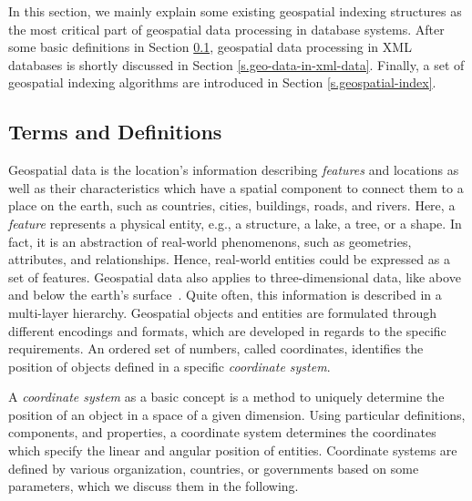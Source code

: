 \documentclass[a4paper,12pt]{article}
\begin{document}
In this section, we mainly explain some existing geospatial indexing structures as the most critical part of geospatial data processing in database systems. After some basic definitions in Section \ref{termsanddef}, geospatial data processing in XML~\cite{www/xml} databases is shortly discussed in Section \ref{s.geo-data-in-xml-data}.
Finally, a set of geospatial indexing algorithms are introduced in Section \ref{s.geospatial-index}.

\subsection{Terms and Definitions}
\label{termsanddef}
Geospatial data is the location's information describing \textit{features} and locations as well as their characteristics which have a spatial component to connect them to a place on the earth, such as countries, cities, buildings, roads, and rivers. Here, a \textit{feature} represents a physical entity, e.g., a structure, a lake, a tree, or a shape. In fact, it is an abstraction of real-world phenomenons, such as geometries, attributes, and relationships. Hence, real-world entities could be expressed as a set of features.
Geospatial data also applies to three-dimensional data, like above and below the earth's surface~\cite{powell}. Quite often, this information is described in a multi-layer hierarchy. Geospatial objects and entities are formulated through different encodings and formats, which are developed in regards to the specific requirements. An ordered set of numbers, called coordinates, identifies the position of objects  defined in a specific \textit{coordinate system}. 

A \emph{coordinate system} as a basic concept is a method to uniquely determine the position of an object in a space of a given dimension. Using particular definitions, components, and properties, a coordinate system determines the coordinates which specify the linear and angular position of entities. Coordinate systems are defined by various organization, countries, or governments based on some parameters, which we discuss them in the following.
\end{document}
